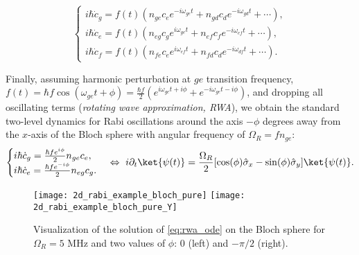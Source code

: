 \begin{equation}
\begin{cases}
i\hbar \dot c_g =  f(t) (n_{ge} c_e e^{-i\omega_{ge}t}+ n_{gd} c_d  e^{-i\omega_{gd}t} + \cdots),\\
i\hbar \dot c_e =  f(t) (n_{eg} c_g e^{i\omega_{ge}t} + n_{ef} c_f e^{-i\omega_{ef}t}+ \cdots),\\
i\hbar \dot c_f =   f(t) (n_{fe} c_e e^{i\omega_{ef}t}+ n_{fd} c_d e^{-i\omega_{df}t} + \cdots).
\end{cases}
\label{eq:c_gef_ode_rf}
\end{equation}

Finally, assuming harmonic perturbation at $ge$ transition frequency, $f(t) = \hbar f \cos(\omega_{ge} t + \phi ) = \frac{\hbar f}{2}(e^{i\omega_{ge} t+i\phi} + e^{-i\omega_{ge} t-i\phi})$, and dropping all oscillating terms (\textit{rotating wave approximation, RWA}), we obtain the standard two-level dynamics for Rabi oscillations around the axis $-\phi$ degrees away from the $x$-axis of the Bloch sphere with angular frequency of $\Omega_R = f n_{ge}$:
\begin{equation}
\begin{cases}
i\hbar \dot c_g =  \frac{\hbar fe^{i\phi}}{2} n_{ge} c_e,\\
i\hbar \dot c_e =   \frac{\hbar fe^{-i\phi}}{2} n_{eg} c_g.
\end{cases} \Leftrightarrow\  i\partial_t \ket{\psi (t)} = \frac{\Omega_R}{2}[\cos(\phi)\hat \sigma_x - \sin(\phi)\hat \sigma_y]\ket{\psi(t)}.
\label{eq:rwa_ode}
\end{equation}

\begin{figure}
\centering
\texttt{[image: 2d\_rabi\_example\_bloch\_pure]}\quad
\texttt{[image: 2d\_rabi\_example\_bloch\_pure\_Y]}
\caption{Visualization of the solution of \eqref{eq:rwa_ode} on the Bloch sphere for $\Omega_R=5$ MHz and two values of $\phi$: 0 (left) and $-\pi/2$ (right).}
\label{fig:bloch_rot}
\end{figure}

